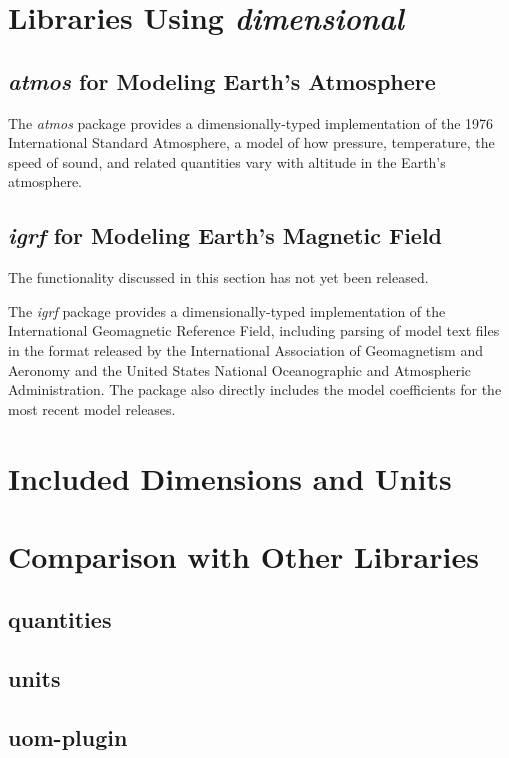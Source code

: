 \documentclass[11pt]{report}
\newcommand{\packagename}[1]{\textit{#1}}
\newcommand{\thispackage}{\packagename{dimensional}}
\newcommand{\prerelease}{\begin{framed}
The functionality discussed in this section has not yet been released.
\end{framed}}
\begin{document}
\chapter{Libraries Using \thispackage}

\section{\packagename{atmos} for Modeling Earth's Atmosphere}

The \packagename{atmos} package provides a dimensionally-typed implementation of the 1976 International Standard
Atmosphere, a model of how pressure, temperature, the speed of sound, and related quantities vary with
altitude in the Earth's atmosphere.

\section{\packagename{igrf} for Modeling Earth's Magnetic Field}

\prerelease{}

The \packagename{igrf} package provides a dimensionally-typed implementation of the International Geomagnetic
Reference Field, including parsing of model text files in the format released by the International Association of
Geomagnetism and Aeronomy and the United States National Oceanographic and Atmospheric Administration. The
package also directly includes the model coefficients for the most recent model releases.

\chapter{Included Dimensions and Units}

\chapter{Comparison with Other Libraries}

\section{quantities}
\section{units}
\section{uom-plugin}
\end{document}
